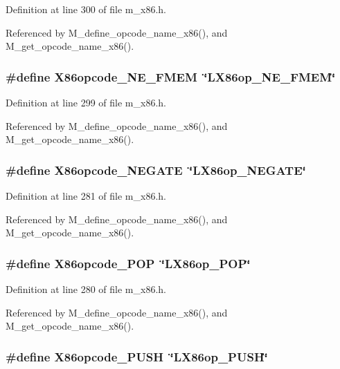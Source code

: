 Definition at line 300 of file m\_\-x86.h.

Referenced by M\_\-define\_\-opcode\_\-name\_\-x86(), and M\_\-get\_\-opcode\_\-name\_\-x86().
\subsubsection{\setlength{\rightskip}{0pt plus 5cm}\#define X86opcode\_\-NE\_\-FMEM~\char`\"{}LX86op\_\-NE\_\-FMEM\char`\"{}}\label{m__x86_8h_2e692335eea39399d68267fab7f96134}




Definition at line 299 of file m\_\-x86.h.

Referenced by M\_\-define\_\-opcode\_\-name\_\-x86(), and M\_\-get\_\-opcode\_\-name\_\-x86().
\subsubsection{\setlength{\rightskip}{0pt plus 5cm}\#define X86opcode\_\-NEGATE~\char`\"{}LX86op\_\-NEGATE\char`\"{}}\label{m__x86_8h_68c96f3ed5c2690f4f205286d7bd3f94}




Definition at line 281 of file m\_\-x86.h.

Referenced by M\_\-define\_\-opcode\_\-name\_\-x86(), and M\_\-get\_\-opcode\_\-name\_\-x86().
\subsubsection{\setlength{\rightskip}{0pt plus 5cm}\#define X86opcode\_\-POP~\char`\"{}LX86op\_\-POP\char`\"{}}\label{m__x86_8h_ae8d63d3940bd332f3da9687f86a9e4c}




Definition at line 280 of file m\_\-x86.h.

Referenced by M\_\-define\_\-opcode\_\-name\_\-x86(), and M\_\-get\_\-opcode\_\-name\_\-x86().
\subsubsection{\setlength{\rightskip}{0pt plus 5cm}\#define X86opcode\_\-PUSH~\char`\"{}LX86op\_\-PUSH\char`\"{}}\label{m__x86_8h_eee35427e9e5be9e188d7147006cb4be}




